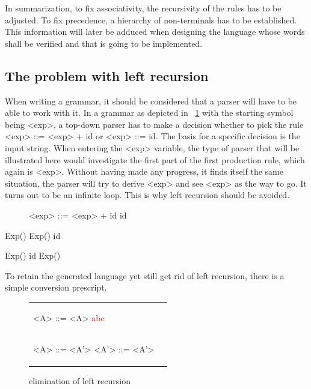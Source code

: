 In summarization, to fix associativity, the recursivity of the rules has to be adjusted. To fix precedence, a hierarchy of non-terminals has to be established. This information will later be adduced when designing the language whose words shall be verified and that is going to be implemented.

\subsection{The problem with left recursion}

When writing a grammar, it should be considered that a parser will have to be able to work with it. In a grammar as depicted in ~\ref{grammarLR} with the starting symbol being <exp>, a top-down parser has to make a decision whether to pick the rule <exp> ::= <exp> + id or <exp> ::= id. The basis for a specific decision is the input string. When entering the <exp> variable, the type of parser that will be illustrated here would investigate the first part of the first production rule, which again is <exp>. Without having made any progress, it finds itself the same situation, the parser will try to derive <exp> and see <exp> as the way to go. It turns out to be an infinite loop. This is why left recursion should be avoided.

\begin{figure}
	\label{grammarLR}

	\begin{grammar}
		<exp> ::= <exp> + id
		\alt id
	\end{grammar}
\end{figure}

Exp()
{
	Exp()
	id
}

Exp()
{
	id
	Exp()
}

To retain the generated language yet still get rid of left recursion, there is a simple conversion prescript.

\begin{figure}
	\label{ambGrammarPrecFixedTree}
	\caption{elimination of left recursion}

	\begin{center}
		\begin{tabular}{p{5cm} p{5cm}}
			\begin{grammar}
				<A> ::= <A> \textcolor{red}{abc}
				\alt \textcolor{blue}{\beta}
			\end{grammar}
			\\
			\begin{grammar}
				<A> ::= \textcolor{blue}{\beta} <A'>
				<A'> ::= \textcolor{red}{\alpha} <A'>
				\alt \epsilon
			\end{grammar}
		\end{tabular}
	\end{center}
\end{figure}

